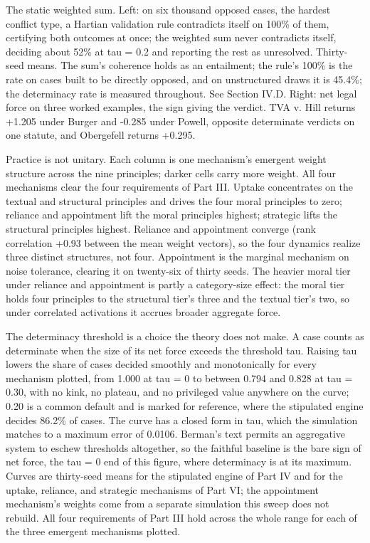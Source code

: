 \caption{The static weighted sum. Left: on six thousand opposed cases, the hardest conflict type, a Hartian validation rule contradicts itself on 100\% of them, certifying both outcomes at once; the weighted sum never contradicts itself, deciding about 52\% at tau = 0.2 and reporting the rest as unresolved. Thirty-seed means. The sum's coherence holds as an entailment; the rule's 100\% is the rate on cases built to be directly opposed, and on unstructured draws it is 45.4\%; the determinacy rate is measured throughout. See Section IV.D. Right: net legal force on three worked examples, the sign giving the verdict. TVA v. Hill returns +1.205 under Burger and -0.285 under Powell, opposite determinate verdicts on one statute, and Obergefell returns +0.295.}

\caption{Practice is not unitary. Each column is one mechanism's emergent weight structure across the nine principles; darker cells carry more weight. All four mechanisms clear the four requirements of Part III. Uptake concentrates on the textual and structural principles and drives the four moral principles to zero; reliance and appointment lift the moral principles highest; strategic lifts the structural principles highest. Reliance and appointment converge (rank correlation +0.93 between the mean weight vectors), so the four dynamics realize three distinct structures, not four. Appointment is the marginal mechanism on noise tolerance, clearing it on twenty-six of thirty seeds. The heavier moral tier under reliance and appointment is partly a category-size effect: the moral tier holds four principles to the structural tier's three and the textual tier's two, so under correlated activations it accrues broader aggregate force.}

\caption{The determinacy threshold is a choice the theory does not make. A case counts as determinate when the size of its net force exceeds the threshold tau. Raising tau lowers the share of cases decided smoothly and monotonically for every mechanism plotted, from 1.000 at tau = 0 to between 0.794 and 0.828 at tau = 0.30, with no kink, no plateau, and no privileged value anywhere on the curve; 0.20 is a common default and is marked for reference, where the stipulated engine decides 86.2\% of cases. The curve has a closed form in tau, which the simulation matches to a maximum error of 0.0106. Berman's text permits an aggregative system to eschew thresholds altogether, so the faithful baseline is the bare sign of net force, the tau = 0 end of this figure, where determinacy is at its maximum. Curves are thirty-seed means for the stipulated engine of Part IV and for the uptake, reliance, and strategic mechanisms of Part VI; the appointment mechanism's weights come from a separate simulation this sweep does not rebuild. All four requirements of Part III hold across the whole range for each of the three emergent mechanisms plotted.}

